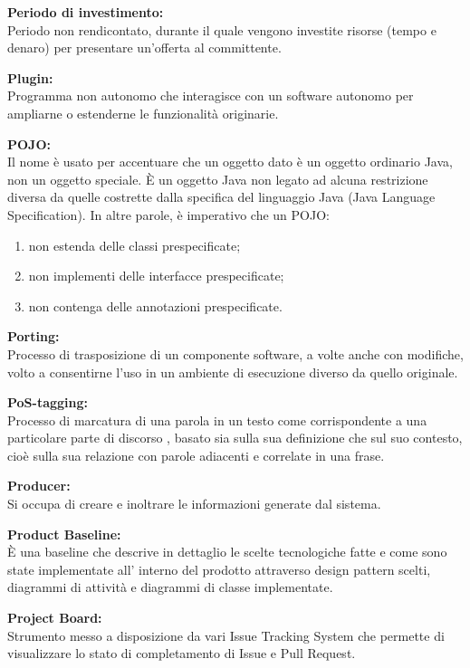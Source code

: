 \documentclass[a4paper, oneside, openany, dvipsnames, table]{article}
\begin{document}
\textbf{Periodo di investimento:}\\	Periodo non rendicontato, durante il quale vengono investite risorse (tempo e denaro) per presentare un'offerta al committente.

\textbf{Plugin:}\\	Programma non autonomo che interagisce con un software autonomo per ampliarne o estenderne le funzionalità originarie.

\label{crts:POJO}
\textbf{POJO:}\\	Il nome è usato per accentuare che un oggetto dato è un oggetto ordinario Java, non un oggetto speciale. \`E un oggetto Java non legato ad alcuna restrizione diversa da quelle costrette dalla specifica del linguaggio Java (Java Language Specification). In altre parole, è imperativo che un POJO:
\begin{enumerate}
\item non estenda delle classi prespecificate;
\item non implementi delle interfacce prespecificate;
\item non contenga delle annotazioni prespecificate.
\end{enumerate}

\textbf{Porting:}\\	Processo di trasposizione di un componente software, a volte anche con modifiche, volto a consentirne l'uso in un ambiente di esecuzione diverso da quello originale.

\textbf{PoS-tagging:}\\	 Processo di marcatura di una parola in un testo come corrispondente a una particolare parte di discorso , basato sia sulla sua definizione che sul suo contesto, cioè sulla sua relazione con parole adiacenti e correlate in una frase.

\textbf{Producer:}\\	Si occupa di creare e inoltrare le informazioni generate dal sistema.

\textbf{Product Baseline:}\\	\`E una baseline che descrive in dettaglio le scelte tecnologiche fatte e come sono state implementate all' interno del prodotto attraverso design pattern scelti, diagrammi di attività e diagrammi di classe implementate.

\textbf{Project Board:}\\	Strumento messo a disposizione da vari Issue Tracking System che permette di visualizzare lo stato di completamento di Issue e Pull Request.
\end{document}
